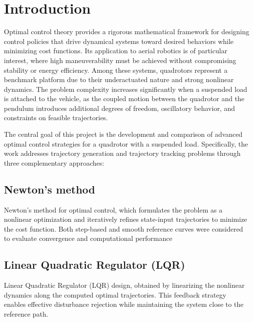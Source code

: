 \documentclass[a4paper,11pt,oneside]{book}
\begin{document}
\chapter*{Introduction}
\begin{justify}

    Optimal control theory provides a rigorous mathematical framework for designing control policies that drive dynamical systems toward desired behaviors while minimizing cost functions. Its application to aerial robotics is of particular interest, where high maneuverability must be achieved without compromising stability or energy efficiency. Among these systems, quadrotors represent a benchmark platform due to their underactuated nature and strong nonlinear dynamics. The problem complexity increases significantly when a suspended load is attached to the vehicle, as the coupled motion between the quadrotor and the pendulum introduces additional degrees of freedom, oscillatory behavior, and constraints on feasible trajectories.
    
    The central goal of this project is the development and comparison of advanced optimal control strategies for a quadrotor with a suspended load. Specifically, the work addresses trajectory generation and trajectory tracking problems through three complementary approaches:
    
\end{justify}

\section*{Newton’s method}

\begin{justify}
    Newton’s method for optimal control, which formulates the problem as a nonlinear optimization and iteratively refines state-input trajectories to minimize the cost function. Both step-based and smooth reference curves were considered to evaluate convergence and computational performance
\end{justify}


\section*{Linear Quadratic Regulator (LQR)}
\begin{justify}
    Linear Quadratic Regulator (LQR) design, obtained by linearizing the nonlinear dynamics along the computed optimal trajectories. This feedback strategy enables effective disturbance rejection while maintaining the system close to the reference path.
\end{justify}
\end{document}
